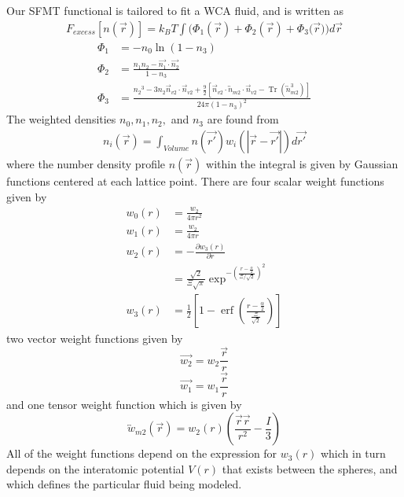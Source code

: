 \documentclass[double,12pt]{beavtex}
\begin{document}
Our SFMT functional is tailored to fit a WCA fluid, and 
is written as 
\begin{align}\label{eq:Fexfunctional}
  F_{excess}[n(\vec{r})]=k_BT\int(\Phi_1(\vec{r})+\Phi_2(\vec{r})+\Phi_3(\vec{r}{)) d}\vec{r}
\end{align}
\begin{align}
\Phi_1 &= -n_{0}\ln(1-n_{3}) \\
\Phi_2 &= \frac{n_{1}n_{2}-\vec{n_{1}}\cdot\vec{n_{2}}}{1-n_{3}} \\
\Phi_3 &= \frac{{n_2}^3-3n_2\vec{n}_{v2}\cdot\vec{n}_{v2}+\frac{9}{2}[\vec{n}_{v2}\cdot{\overleftrightarrow{n}_{m2}}\cdot{\vec{n}_{v2}}-\operatorname{Tr}({\overleftrightarrow{n}^3_{m2}})]}{24\pi(1-n_3)^2}  
\end{align} 
The weighted densities $n_0, n_1, n_2,$ and $n_3$ are found from
\begin{align}\label{eq:numdenprofile}
	n_i(\vec{r})=\int_{Volume}{n(\vec{r'})w_i(|\vec{r}-\vec{r'}|)d{\vec{r'}}}
\end{align}
where the number density profile $n(\vec r)$ within the integral is given 
by Gaussian functions centered at each lattice point.
There are four scalar weight functions given by
\begin{align}\label{eq:weights}
  w_{0}(r) &=\frac{w_{2}}{4\pi{r}^2} \\
  w_{1}(r) &=\frac{w_{2}}{4\pi{r}} \\
  w_2(r) &=-\frac{\partial{w_3(r)}}{\partial{r}} \\
  &= \frac{\sqrt{2}}{\Xi\sqrt\pi}\exp^{-\left(\frac{r-\frac{\alpha}{2}}{\Xi/\sqrt{2}}\right)^2}  \\
  w_3(r) &=\frac{1}{2}\left[1-\operatorname{erf}\left(\frac{r-\frac{\alpha}{2}}{\frac{\Xi}{\sqrt{2}}}\right)\right]  
\end{align}
two vector weight functions given by 
\begin{equation}\label{eq:w_v2}{  \vec{w_{2}}=w_{2}\frac{\vec{r}}{r}  }\end{equation}
\begin{equation}\label{eq:w_v1}{  \vec{w_{1}}=w_{1}\frac{\vec{r}}{r}  }\end{equation} 
and one tensor weight function which is given by
\begin{equation}\label{eq:tensorweight-methods}\overleftrightarrow{w}_{m2}(\vec{r}) = w_2(r)\left(\frac{\vec{r}\vec{r}}{r^2}-\frac{I}{3}\right)\end{equation}
All of the weight functions depend on the expression for $w_3(r)$ 
which in turn depends on the interatomic potential $V(r)$ that exists 
between the spheres, and which defines the particular fluid being modeled.
\end{document}
